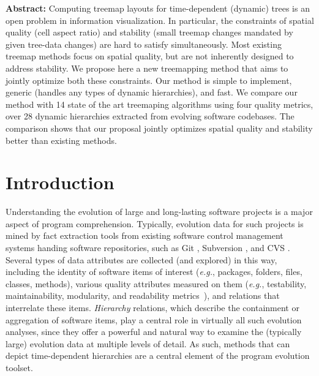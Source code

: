 \noindent \textbf{Abstract:}
Computing treemap layouts for time-dependent (dynamic) trees is an open problem in information visualization. In particular, the constraints of spatial quality (cell aspect ratio) and stability (small treemap changes mandated by given tree-data changes) are hard to satisfy simultaneously. Most existing treemap methods focus on spatial quality, but are not inherently designed to address stability. We propose here a new treemapping method that aims to jointly optimize both these constraints. Our method is simple to implement, generic (handles any types of dynamic hierarchies), and fast. We compare our method with 14 state of the art treemaping algorithms using four quality metrics, over 28 dynamic hierarchies extracted from evolving software codebases. The comparison shows that our proposal jointly optimizes spatial quality and stability better than existing methods.


\section{Introduction} \label{sec:intro}
%
%
Understanding the evolution of large and long-lasting software projects is a major aspect of program comprehension. Typically, evolution data for such projects is mined by fact extraction tools from existing software control management systems handing software repositories, such as Git \citep{git}, Subversion \citep{subversion}, and CVS \citep{cvs}.
Several types of data attributes are collected (and explored) in this way, including the identity of software items of interest (\emph{e.g.}, packages, folders, files, classes, methods), various quality attributes measured on them (\emph{e.g.}, testability, maintainability, modularity, and readability metrics~\citep{lanza06}), and relations that interrelate these items. \emph{Hierarchy} relations, which describe the containment or aggregation of software items, play a central role in virtually all such evolution analyses, since they offer a powerful and natural way to examine the (typically large) evolution data at multiple levels of detail. As such, methods that can depict time-dependent hierarchies are a central element of the program evolution toolset.

